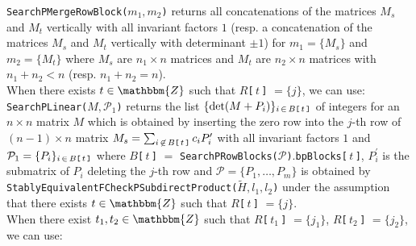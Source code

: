 \documentclass{amsart}
\theoremstyle{plain}
\theoremstyle{definition}
\theoremstyle{remark}
\newcommand{\bZ}{\mathbbm{Z}}\newcommand{\bQ}{\mathbbm{Q}}
\newcounter{sub}\def\tr{\mbox{tr }}
\begin{document}
\noindent 
{\tt SearchPMergeRowBlock($m_1,m_2$)} 
returns all concatenations of the matrices $M_s$ and $M_t$ vertically 
with all invariant factors $1$ 
(resp. a concatenation of the matrices $M_s$ and $M_t$ vertically 
with determinant $\pm 1$) 
for $m_1=\{M_s\}$ and $m_2=\{M_t\}$ 
where $M_s$ are $n_1\times n$ matrices 
and $M_t$ are $n_2\times n$ matrices 
with $n_1+n_2<n$ (resp. $n_1+n_2=n$).\\

When there exists $t\in\bZ$ such that $R${\tt [}\,$t$\,{\tt ]} $=\{j\}$, 
we can use:\\

\noindent 
{\tt SearchPLinear($M,\mathcal{P}_1$)}
returns the list $\{{\rm det}(M+P_i)\}_{i\,\in\,B\mbox{\tt\scriptsize [}\,t\,\mbox{\tt\scriptsize ]}}$ 
of integers for an $n\times n$ matrix $M$ 
which is obtained by inserting the zero row into the $j$-th row of 
$(n-1)\times n$ matrix 
$M_s=\sum_{i\,\not\in\,B\mbox{\tt\scriptsize [}\,t\,\mbox{\tt\scriptsize ]}} c_i P_i^\prime$ 
with all invariant factors $1$ 
and $\mathcal{P}_1=\{P_i\}_{i\,\in\, B\mbox{\tt\scriptsize [}\,t\,\mbox{\tt\scriptsize ]}}$
where $B${\tt [}\,$t$\,{\tt ]} $=$ {\tt SearchPRowBlocks($\mathcal{P}$)}.{\tt bpBlocks[}\,$t$\,{\tt ]}, 
$P_i^\prime$ is the submatrix of $P_i$ deleting the $j$-th row 
and 
$\mathcal{P}=\{P_1,\ldots,P_m\}$ is obtained by 
{\tt StablyEquivalentFCheckPSubdirectProduct($\widetilde{H},l_1,l_2$)} 
under the assumption that 
there exists $t\in\bZ$ such that $R${\tt [}\,$t$\,{\tt ]} $=\{j\}$.\\

When there exist $t_1, t_2\in\bZ$ such that 
$R${\tt [}\,$t_1$\,{\tt ]} $=\{j_1\}$, 
$R${\tt [}\,$t_2$\,{\tt ]} $=\{j_2\}$, 
we can use:\\
\end{document}

